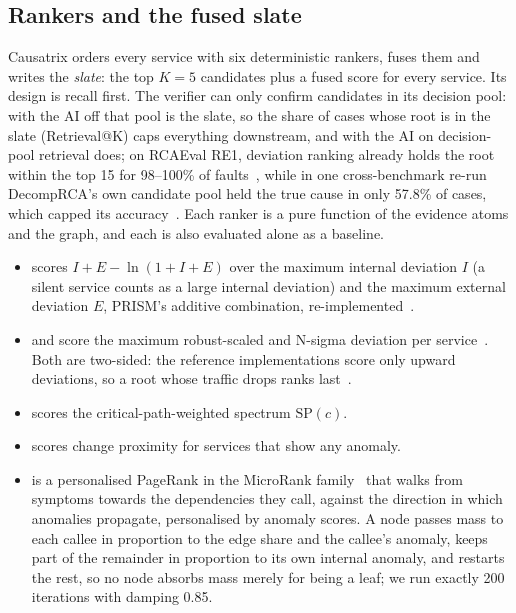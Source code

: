 \subsection{Rankers and the fused slate}
\label{sec:slate}

Causatrix orders every service with six deterministic rankers, fuses them and writes the \emph{slate}: the top $K=5$ candidates plus a fused score for every service.
Its design is recall first.
The verifier can only confirm candidates in its decision pool: with the AI off that pool is the slate, so the share of cases whose root is in the slate (Retrieval@K) caps everything downstream, and with the AI on decision-pool retrieval does; on RCAEval RE1, deviation ranking already holds the root within the top 15 for 98--100\% of faults~\cite{decomprca2026}, while in one cross-benchmark re-run DecompRCA's own candidate pool held the true cause in only 57.8\% of cases, which capped its accuracy~\cite{rcatlas2026}.
Each ranker is a pure function of the evidence atoms and the graph, and each is also evaluated alone as a baseline.

\begin{itemize}
\item {} scores $I + E - \ln(1 + I + E)$ over the maximum internal deviation $I$ (a silent service counts as a large internal deviation) and the maximum external deviation $E$, PRISM's additive combination, re-implemented~\cite{prism2026}.
\item {} and  score the maximum robust-scaled and N-sigma deviation per service~\cite{baro2024,rcaeval2024}. Both are two-sided: the reference implementations score only upward deviations, so a root whose traffic drops ranks last~\cite{rcatlas2026}.
\item {} scores the critical-path-weighted spectrum $\text{SP}(c)$.
\item {} scores change proximity for services that show any anomaly.
\item {} is a personalised PageRank in the MicroRank family~\cite{microrank} that walks from symptoms towards the dependencies they call, against the direction in which anomalies propagate, personalised by anomaly scores. A node passes mass to each callee in proportion to the edge share and the callee's anomaly, keeps part of the remainder in proportion to its own internal anomaly, and restarts the rest, so no node absorbs mass merely for being a leaf; we run exactly 200 iterations with damping 0.85.
\end{itemize}

